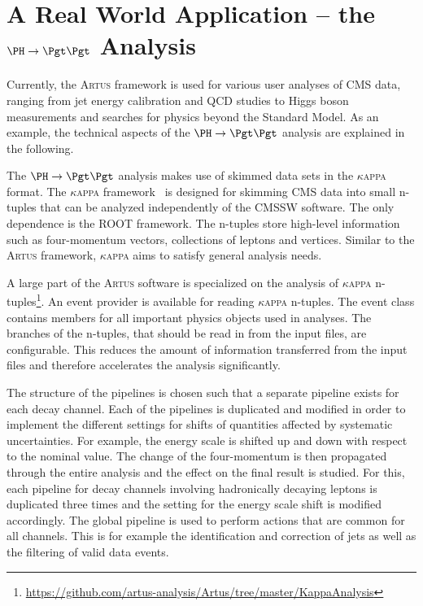 \documentclass[3p]{elsarticle}
\newcommand{\software}[1]{\textsc{#1}\xspace}
\newcommand{\artus}{\software{Artus}}
\newcommand{\kapa}{{\Large$\kappa$}\software{appa}}
\begin{document}
\section{\texorpdfstring{A Real World Application -- the $\PH\to\Pgt\Pgt$ Analysis}{A Real World Application - the H to Tau Tau Analysis}}
\label{section_artus_example_htt}

Currently, the \artus framework is used for various user analyses of CMS data, ranging from jet energy calibration and QCD studies to Higgs boson measurements and searches for physics beyond the Standard Model.
As an example, the technical aspects of the $\PH\to\Pgt\Pgt$ analysis are explained in the following.

The $\PH\to\Pgt\Pgt$ analysis makes use of skimmed data sets in the \kapa format.
The \kapa framework~\cite{kappa} is designed for skimming CMS data into small n-tuples that can be analyzed independently of the CMSSW software.
The only dependence is the ROOT framework.
The n-tuples store high-level information such as four-momentum vectors, collections of leptons and vertices.
Similar to the \artus framework, \kapa aims to satisfy general analysis needs.

A large part of the \artus software is specialized on the analysis of \kapa n-tuples\footnote{\url{https://github.com/artus-analysis/Artus/tree/master/KappaAnalysis}}.
An event provider is available for reading \kapa n-tuples.
The event class contains members for all important physics objects used in analyses.
The branches of the n-tuples, that should be read in from the input files, are configurable.
This reduces the amount of information transferred from the input files and therefore accelerates the analysis significantly.

The structure of the pipelines is chosen such that a separate pipeline exists for each decay channel.
Each of the pipelines is duplicated and modified in order to implement the different settings for shifts of quantities affected by systematic uncertainties.
For example, the \Pgt energy scale is shifted up and down with respect to the nominal value.
The change of the \Pgt four-momentum is then propagated through the entire analysis and the effect on the final result is studied.
For this, each pipeline for decay channels involving hadronically decaying \Pgt leptons is duplicated three times and the setting for the \Pgt energy scale shift is modified accordingly.
The global pipeline is used to perform actions that are common for all channels.
This is for example the identification and correction of jets as well as the filtering of valid data events.
\end{document}
